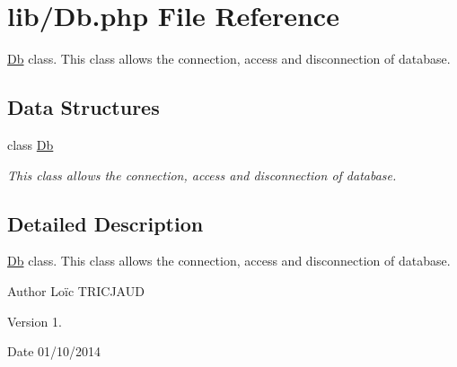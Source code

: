 \hypertarget{_db_8php}{\section{lib/\-Db.php File Reference}
\label{_db_8php}
}


\hyperlink{class_db}{Db} class. This class allows the connection, access and disconnection of database.  


\subsection*{Data Structures}
\begin{DoxyCompactItemize}
\item 
class \hyperlink{class_db}{Db}
\begin{DoxyCompactList}\small\item\em This class allows the connection, access and disconnection of database. \end{DoxyCompactList}\end{DoxyCompactItemize}


\subsection{Detailed Description}
\hyperlink{class_db}{Db} class. This class allows the connection, access and disconnection of database. \begin{DoxyAuthor}{Author}
Loïc T\-R\-I\-C\-J\-A\-U\-D 
\end{DoxyAuthor}
\begin{DoxyVersion}{Version}
1. 
\end{DoxyVersion}
\begin{DoxyDate}{Date}
01/10/2014 
\end{DoxyDate}
